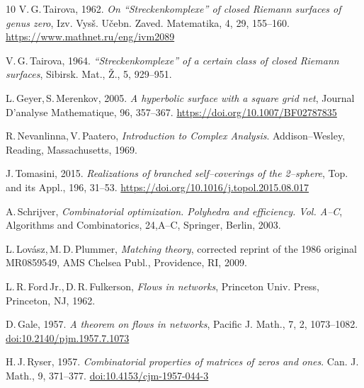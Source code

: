 \documentclass[final,3p,times]{elsarticle}
\theoremstyle{definition}
\begin{document}
\begin{thebibliography}{10}
V.\,G.\,Tairova, 
1962.
\emph{On ``Streckenkomplexe'' of closed Riemann surfaces of genus zero}, 
Izv. Vys\v s. U\v cebn. Zaved. Matematika,
4, 29, 155--160. 
\url{https://www.mathnet.ru/eng/ivm2089}

V.\,G.\,Tairova, 
1964.
\emph{``Streckenkomplexe'' of a certain class of closed Riemann surfaces}, 
Sibirsk. Mat., 
\v Z., 5, 929--951.

L.\,Geyer,\,S.\,Merenkov, 
2005.
\emph{A hyperbolic surface with a square grid net}, 
Journal D'analyse Mathematique, 
96, 357--367.
\url{https://doi.org/10.1007/BF02787835}

R.\,Nevanlinna,\,V.\,Paatero,
\emph{Introduction to Complex Analysis}. 
Addison--Wesley, 
Reading, Massachusetts, 1969. 

J.\,Tomasini,
2015.
\emph{Realizations of branched self--coverings of the 2--sphere},
Top. and its Appl., 
196, 31--53. 
\url{https://doi.org/10.1016/j.topol.2015.08.017}


A.\,Schrijver, 
\emph{Combinatorial optimization. Polyhedra and efficiency. Vol. A--C}, Algorithms and Combinatorics, 24,A--C, Springer, Berlin, 
2003.

L.\,Lov\'asz,\,M.\,D.\,Plummer, 
\emph{Matching theory}, corrected reprint of the 1986 original MR0859549, 
AMS Chelsea Publ., Providence, RI, 2009.

L.\,R.\,Ford\,Jr.,\,D.\,R.\,Fulkerson, 
\emph{Flows in networks}, 
Princeton Univ. Press, Princeton, NJ, 
1962.

D.\,Gale, 
1957.
\emph{A theorem on flows in networks}, 
Pacific J. Math., 7, 2, 1073–1082. 
\url{doi:10.2140/pjm.1957.7.1073}

H.\,J.\,Ryser, 
1957.
\emph{Combinatorial properties of matrices of zeros and ones}. 
Can. J. Math., 
9, 371–377. 
\url{doi:10.4153/cjm-1957-044-3}

\end{thebibliography}
\end{document}
